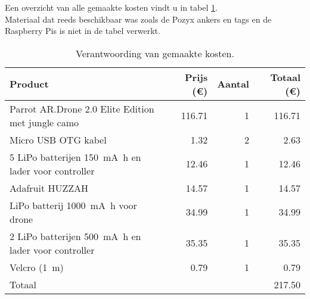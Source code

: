 Een overzicht van alle gemaakte kosten vindt u in tabel \ref{tab:kosten}.\\
Materiaal dat reeds beschikbaar was zoals de Pozyx ankers en tags en de Raspberry Pis is niet in de tabel verwerkt.
\begin{table}[p]
\centering
\begin{tabular}{ |l|r|r|r| } \hline
Product & Prijs (\euro{}) & Aantal & Totaal (\euro{}) \\ [.5ex] \hline \hline
Parrot AR.Drone 2.0 Elite Edition met jungle camo & 116.71 & 1 & 116.71 \\ \hline
Micro USB OTG kabel & 1.32 & 2 & 2.63 \\ \hline
5 LiPo batterijen \SI{150}{\mA\hour} en lader voor controller & 12.46 & 1 & 12.46 \\ \hline
Adafruit HUZZAH & 14.57 & 1 & 14.57 \\ \hline
LiPo batterij \SI{1000}{\mA\hour} voor drone & 34.99 & 1 & 34.99 \\ \hline
2 LiPo batterijen \SI{500}{\mA\hour} en lader voor controller & 35.35 & 1 & 35.35 \\ [.5ex] \hline
Velcro (\SI{1}{\m}) & 0.79 & 1 & 0.79 \\ \hline
\hline
Totaal & & & 217.50 \\ \hline
\end{tabular}
\caption[Kosten]{Verantwoording van gemaakte kosten.}
\label{tab:kosten}
\end{table}